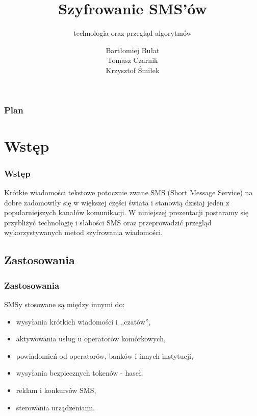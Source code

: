 \documentclass[xcolor=table]{beamer}
\title{Szyfrowanie SMS’ów}
\subtitle{technologia oraz przegląd algorytmów}
\author{Bartłomiej Bułat\\
Tomasz Czarnik\\
Krzysztof Śmiłek\\}
\begin{document}
\begin{frame}
  \titlepage
\end{frame}


\begin{frame}
  \frametitle{Plan}
  \tableofcontents
\end{frame}


\section{Wstęp}

\begin{frame}
  \frametitle{Wstęp}
 Krótkie wiadomości tekstowe potocznie zwane SMS (Short Message Service) na dobre zadomowiły się w większej części świata i stanowią dzisiaj jeden z popularniejszych kanałów komunikacji. \newline
\newline
W niniejszej prezentacji postaramy się przybliżyć technologię i słabości SMS oraz przeprowadzić przegląd wykorzystywanych metod szyfrowania wiadomości.  
\end{frame}

\subsection{Zastosowania}
\begin{frame}
  \frametitle{Zastosowania}

SMSy stosowane są między innymi do:
\begin{itemize}
\item wysyłania krótkich wiadomości i ,,czatów'',
\item aktywowania usług u operatorów komórkowych,
\item powiadomień od operatorów, banków i innych instytucji,
\item wysyłania bezpiecznych tokenów - haseł,
\item reklam i konkursów SMS,
\item sterowania urządzeniami. 
\end{itemize}
   
\end{frame}
\end{document}
